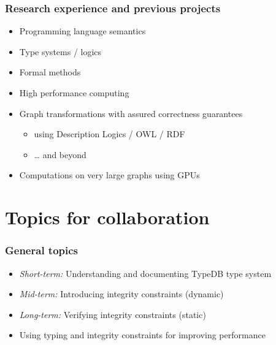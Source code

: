 \documentclass{beamer}
\begin{document}
\begin{frame}[fragile]\frametitle{Research experience and previous projects}

  \begin{itemize}
  \item Programming language semantics
  \item Type systems / logics
  \item Formal methods 
  \item High performance computing
  \end{itemize}

  \begin{itemize}
  \item Graph transformations with assured correctness guarantees
    \begin{itemize}
    \item using Description Logics / OWL / RDF
    \item \dots{} and beyond
    \end{itemize}
  \item Computations on very large graphs using GPUs
  \end{itemize}

\end{frame}

\section{Topics for collaboration}

\begin{frame}[fragile]\frametitle{General topics}

  \begin{itemize}
  \item \emph{Short-term:} Understanding and documenting TypeDB type system
  \item \emph{Mid-term:} Introducing integrity constraints (dynamic)
  \item \emph{Long-term:} Verifying integrity constraints (static)
  \item Using typing and integrity constraints for improving performance
  \end{itemize}

\end{frame}
\end{document}
